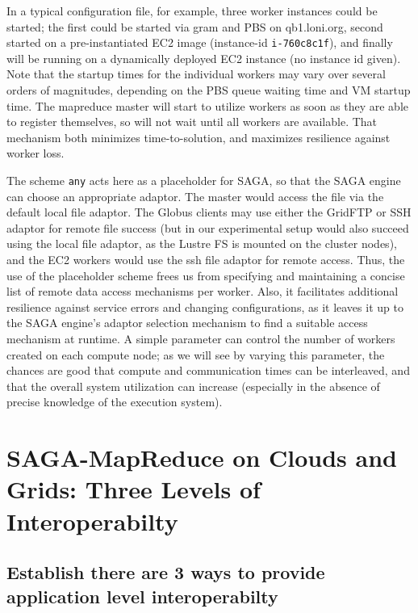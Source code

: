 \documentclass[conference,final]{IEEEtran}
\newcommand{\T}[1]{\texttt{#1}}
\begin{document}
In a typical configuration file, for example, three worker instances
could be started; the first could be started via gram and PBS on
qb1.loni.org, second started on a pre-instantiated EC2 image
(instance-id \T{i-760c8c1f}), and finally will be running on a
dynamically deployed EC2 instance (no instance id given).  Note that
the startup times for the individual workers may vary over several
orders of magnitudes, depending on the PBS queue waiting time and VM
startup time.  The mapreduce master will start to utilize workers as
soon as they are able to register themselves, so will not wait until
all workers are available.  That mechanism both minimizes
time-to-solution, and maximizes resilience against worker loss.

The scheme \T{any} acts here as a placeholder for SAGA, so that the
SAGA engine can choose an appropriate adaptor.  The master would
access the file via the default local file adaptor.  The Globus
clients may use either the GridFTP or SSH adaptor for remote file
success (but in our experimental setup would also succeed 
using the local file adaptor, as the Lustre FS is mounted on the
cluster nodes), and the EC2 workers would use the ssh file adaptor for
remote access.  Thus, the use of the placeholder scheme frees us from
specifying and maintaining a concise list of remote data access
mechanisms per worker.  Also, it facilitates additional resilience
against service errors and changing configurations, as it leaves it up
to the SAGA engine's adaptor selection mechanism to find a suitable
access mechanism at runtime.
A simple parameter can control the number of workers created on each
compute node; as we will see by varying this parameter, the chances
are good that compute and communication times can be interleaved, and
that the overall system utilization can increase (especially in the
absence of precise knowledge of the execution system).
 


\section{SAGA-MapReduce on Clouds and Grids: Three Levels of
  Interoperabilty}

\subsection{Establish there are 3 ways to provide application level
  interoperabilty}
\end{document}
